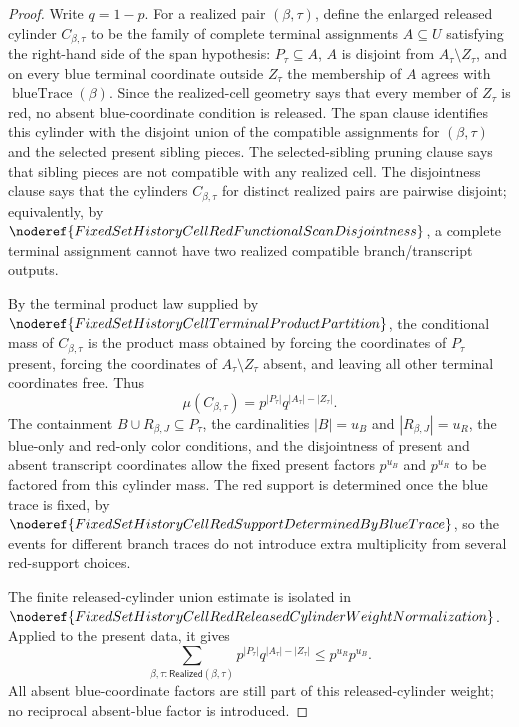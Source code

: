\begin{proof}
Write \(q=1-p\).  For a realized pair \((\beta,\tau)\), define the enlarged
released cylinder \(C_{\beta,\tau}\) to be the family of complete terminal
assignments \(A\subseteq U\) satisfying the right-hand side of the span
hypothesis: \(P_\tau\subseteq A\), \(A\) is disjoint from
\(A_\tau\setminus Z_\tau\), and on every blue terminal coordinate outside
\(Z_\tau\) the membership of \(A\) agrees with
\(\operatorname{blueTrace}(\beta)\).  Since the realized-cell geometry says
that every member of \(Z_\tau\) is red, no absent blue-coordinate condition is
released.  The span clause identifies this cylinder with the disjoint union
of the compatible assignments for \((\beta,\tau)\) and the selected present
sibling pieces.  The selected-sibling pruning clause says that sibling pieces
are not compatible with any realized cell.  The disjointness clause says that
the cylinders \(C_{\beta,\tau}\) for distinct realized pairs are pairwise
disjoint; equivalently, by
\(\noderef{FixedSetHistoryCellRedFunctionalScanDisjointness}\), a complete
terminal assignment cannot have two realized compatible branch/transcript
outputs.

By the terminal product law supplied by
\(\noderef{FixedSetHistoryCellTerminalProductPartition}\), the conditional
mass of \(C_{\beta,\tau}\) is the product mass obtained by forcing the
coordinates of \(P_\tau\) present, forcing the coordinates of
\(A_\tau\setminus Z_\tau\) absent, and leaving all other terminal coordinates
free.  Thus
\[
\mu(C_{\beta,\tau})
=p^{|P_\tau|}q^{|A_\tau|-|Z_\tau|}.
\]
The containment \(B\cup R_{\beta,J}\subseteq P_\tau\), the cardinalities
\(|B|=u_B\) and \(|R_{\beta,J}|=u_R\), the blue-only and red-only color
conditions, and the disjointness of present and absent transcript coordinates
allow the fixed present factors \(p^{u_B}\) and \(p^{u_R}\) to be factored
from this cylinder mass.  The red support is determined once the blue trace
is fixed, by
\(\noderef{FixedSetHistoryCellRedSupportDeterminedByBlueTrace}\), so the
events for different branch traces do not introduce extra multiplicity from
several red-support choices.

The finite released-cylinder union estimate is isolated in
\(\noderef{FixedSetHistoryCellRedReleasedCylinderWeightNormalization}\).
Applied to the present data, it gives
\[
\sum_{\beta,\tau:\mathsf{Realized}(\beta,\tau)}
  p^{|P_\tau|}q^{|A_\tau|-|Z_\tau|}
\le p^{u_R}p^{u_B}.
\]
All absent blue-coordinate factors are still part of this released-cylinder
weight; no reciprocal absent-blue factor is introduced.


\end{proof}
